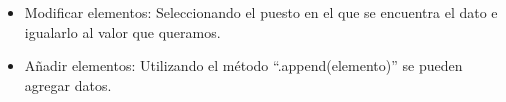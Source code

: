 \begin{itemize}
    \item Modificar elementos: Seleccionando el puesto en el que se encuentra el dato e igualarlo al valor que queramos.
    \begin{figure}[h]
        \centering
      \end{figure}
    \newpage
    \item Añadir elementos: Utilizando el método ``.append(elemento)'' se pueden agregar datos.
    \begin{figure}[h]
        \centering
      \end{figure}
    

\end{itemize}
